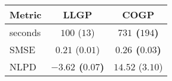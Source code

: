 \begin{tabular}{|l|cc|}\hline\abovespace\belowspace
Metric & LLGP & COGP\\
\hline\abovespace
seconds & $100$ ($13$) & \textbf{$731$ ($194$)}\\
SMSE & $0.21$ ($0.01$) & \textbf{$0.26$ ($0.03$)}\\
NLPD & \textbf{$-3.62$ ($0.07$)} & $14.52$ ($3.10$)
\belowspace \\
\hline
\end{tabular}
